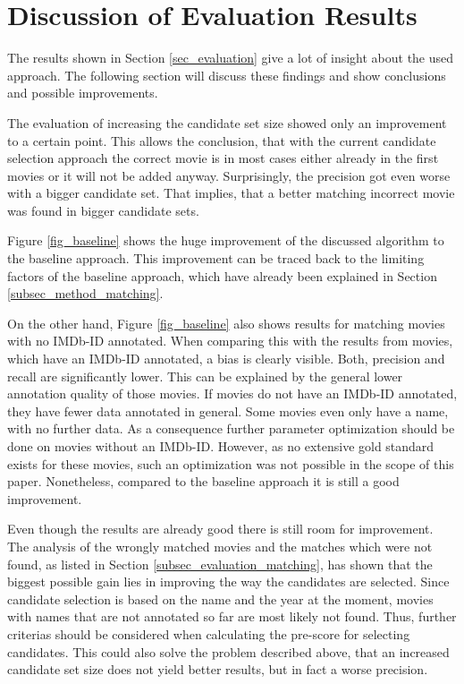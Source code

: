 \section{Discussion of Evaluation Results}
\label{sec_discussion}

The results shown in Section \ref{sec_evaluation} give a lot of insight about the used approach.
The following section will discuss these findings and show conclusions and possible improvements.

The evaluation of increasing the candidate set size showed only an improvement to a certain point.
This allows the conclusion, that with the current candidate selection approach the correct movie is in most cases either already in the first movies or it will not be added anyway.
Surprisingly, the precision got even worse with a bigger candidate set.
That implies, that a better matching incorrect movie was found in bigger candidate sets.

Figure \ref{fig_baseline} shows the huge improvement of the discussed algorithm to the baseline approach.
This improvement can be traced back to the limiting factors of the baseline approach, which have already been explained in Section \ref{subsec_method_matching}.

On the other hand, Figure \ref{fig_baseline} also shows results for matching movies with no IMDb-ID annotated.
When comparing this with the results from movies, which have an IMDb-ID annotated, a bias is clearly visible.
Both, precision and recall are significantly lower.
This can be explained by the general lower annotation quality of those movies.
If movies do not have an IMDb-ID annotated, they have fewer data annotated in general.
Some movies even only have a name, with no further data.
As a consequence further parameter optimization should be done on movies without an IMDb-ID.
However, as no extensive gold standard exists for these movies, such an optimization was not possible in the scope of this paper.
Nonetheless, compared to the baseline approach it is still a good improvement.

Even though the results are already good there is still room for improvement.
The analysis of the wrongly matched movies and the matches which were not found, as listed in Section \ref{subsec_evaluation_matching}, has shown that the biggest possible gain lies in improving the way the candidates are selected.
Since candidate selection is based on the name and the year at the moment, movies with names that are not annotated so far are most likely not found.
Thus, further criterias should be considered when calculating the pre-score for selecting candidates.
This could also solve the problem described above, that an increased candidate set size does not yield better results, but in fact a worse precision.

